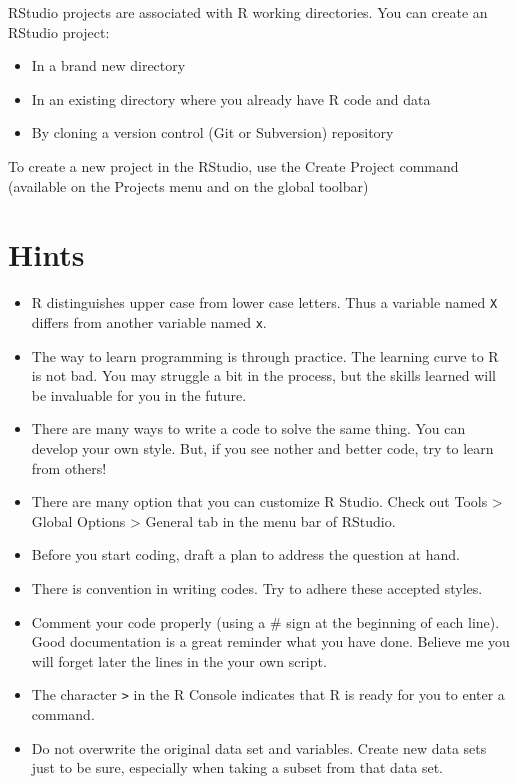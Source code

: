 \documentclass[
]{book}
\providecommand{\tightlist}{%
  \setlength{\itemsep}{0pt}\setlength{\parskip}{0pt}}
\begin{document}
RStudio projects are associated with R working directories. You can create an RStudio project:

\begin{itemize}
\tightlist
\item
  In a brand new directory
\item
  In an existing directory where you already have R code and data
\item
  By cloning a version control (Git or Subversion) repository
\end{itemize}

To create a new project in the RStudio, use the Create Project command (available on the Projects menu and on the global toolbar)

\hypertarget{hints}{%
\section{Hints}\label{hints}}

\begin{itemize}
\tightlist
\item
  R distinguishes upper case from lower case letters. Thus a variable named \texttt{X} differs from another variable named \texttt{x}.
\item
  The way to learn programming is through practice. The learning curve to R is not bad. You may struggle a bit in the process, but the skills learned will be invaluable for you in the future.
\item
  There are many ways to write a code to solve the same thing. You can develop your own style. But, if you see nother and better code, try to learn from others!
\item
  There are many option that you can customize R Studio. Check out Tools \textgreater{} Global Options \textgreater{} General tab in the menu bar of RStudio.
\item
  Before you start coding, draft a plan to address the question at hand.
\item
  There is convention in writing codes. Try to adhere these accepted styles.
\item
  Comment your code properly (using a \# sign at the beginning of each line). Good documentation is a great reminder what you have done. Believe me you will forget later the lines in the your own script.
\item
  The character \texttt{\textgreater{}} in the R Console indicates that R is ready for you to enter a command.\\
\item
  Do not overwrite the original data set and variables. Create new data sets just to be sure, especially when taking a subset from that data set.
\end{itemize}
\end{document}
